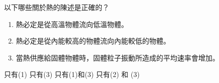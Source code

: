 {
    以下哪些關於熱的陳述是正確的？
    \medskip
    \begin{enumerate}[label=\sd]
        \item 熱必定是從高溫物體流向低溫物體。
        \item 熱必定是從內能較高的物體流向內能較低的物體。
        \item 當熱供應給固體物體時，固體粒子振動所造成的平均速率會增加。
    \end{enumerate}\medskip
    \begin{choices}
        \choice 只有(1)
        \choice 只有(3)
        \CorrectChoice 只有(1)和(3)
        \choice 只有(2) 和 (3)
    \end{choices}
}{}

